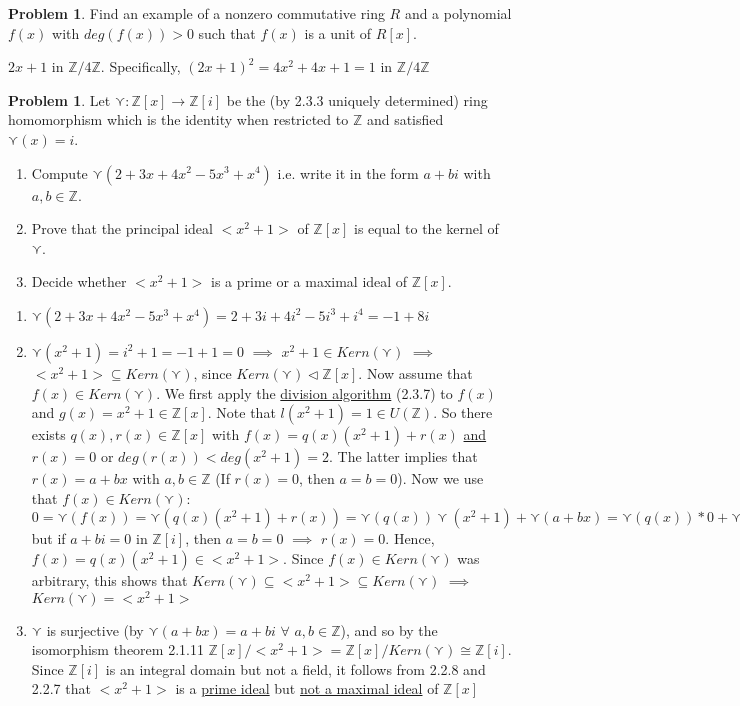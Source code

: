 \documentclass[11pt]{article}
\theoremstyle{definition}
\newtheorem{prob}[thm]{Problem}
\numberwithin{equation}{section}
\newcommand{\Z}{\mathbb{Z}}
\begin{document}
\begin{prob}
Find an example of a nonzero commutative ring $R$ and a polynomial $f(x)$ with $deg(f(x)) > 0$ such that $f(x)$ is a unit of $R[x]$.
\end{prob}

$2x+1$ in $\Z/4\Z$. Specifically, $(2x+1)^{2} = 4x^{2}+4x+1 = 1$ in $\Z/4\Z$

\begin{prob}
Let $\curlyvee: \Z[x] \rightarrow \Z[i]$ be the (by 2.3.3 uniquely determined) ring homomorphism which is the identity when restricted to $\Z$ and satisfied $\curlyvee(x) = i$.
\begin{enumerate}
    \item Compute $\curlyvee(2+3x+4x^{2}-5x^{3}+x^{4})$ i.e. write it in the form $a+bi$ with $a, b \in \Z$.
    \item Prove that the principal ideal $<x^{2}+1>$ of $\Z[x]$ is equal to the kernel of $\curlyvee$.
    \item Decide whether $<x^{2}+1>$ is a prime or a maximal ideal of $\Z[x]$.
\end{enumerate}
\end{prob}

\begin{enumerate}
    \item $\curlyvee(2+3x+4x^{2}-5x^{3}+x^{4}) = 2+3i+4i^{2}-5i^{3}+i^{4} = -1 + 8i$
    \item $\curlyvee(x^{2}+1) = i^{2}+1 = -1+1 = 0$ $\implies$ $x^{2} + 1 \in Kern(\curlyvee)$ $\implies$ $<x^{2}+1> \subseteq Kern(\curlyvee)$, since $Kern(\curlyvee) \vartriangleleft \Z[x]$. Now assume that $f(x) \in Kern(\curlyvee)$. We first apply the \underline{division algorithm} (2.3.7) to $f(x)$ and $g(x) = x^{2}+1 \in \Z[x]$. Note that $l(x^{2}+1) = 1 \in U(\Z)$. So there exists $q(x), r(x) \in \Z[x]$ with $f(x) = q(x)(x^{2}+1)+r(x)$ \underline{and} $r(x) = 0$ or $deg(r(x)) < deg(x^{2}+1) = 2$. The latter implies that $r(x) = a+bx$ with $a, b \in \Z$ (If $r(x) = 0$, then $a = b = 0$). Now we use that $f(x) \in Kern(\curlyvee)$: \\
    $0 = \curlyvee(f(x)) = \curlyvee(q(x)(x^{2}+1) + r(x)) = \curlyvee(q(x))\curlyvee(x^{2}+1)+\curlyvee(a+bx) = \curlyvee(q(x))*0+\curlyvee(a+bx) = \curlyvee(a+bx) = a+bi$ but if $a+bi = 0$ in $\Z[i]$, then $a = b = 0$ $\implies$ \underline{$r(x) = 0$}. Hence, $f(x) = q(x)(x^{2}+1) \in <x^{2}+1>$. Since $f(x) \in Kern(\curlyvee)$ was arbitrary, this shows that $Kern(\curlyvee) \subseteq <x^{2}+1> \subseteq Kern(\curlyvee)$ $\implies$ \underline{$Kern(\curlyvee) = <x^{2}+1>$}
    \item $\curlyvee$ is surjective (by $\curlyvee(a+bx) = a+bi$ $\forall$ $a, b \in \Z$), and so by the isomorphism theorem 2.1.11 $\Z[x]/<x^{2}+1> = \Z[x]/Kern(\curlyvee) \cong \Z[i]$. Since $\Z[i]$ is an integral domain but not a field, it follows from 2.2.8 and 2.2.7 that $<x^{2}+1>$ is a \underline{prime ideal} but \underline{not a maximal ideal} of $\Z[x]$
\end{enumerate}
\end{document}

